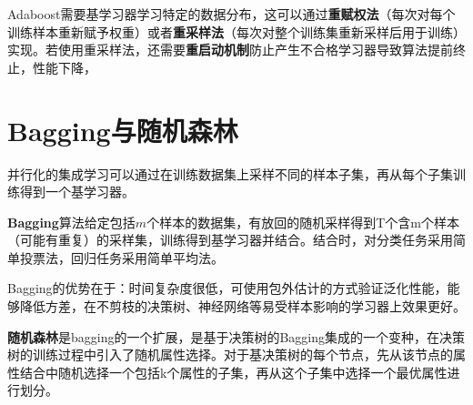 Adaboost需要基学习器学习特定的数据分布，这可以通过\textbf{重赋权法}（每次对每个训练样本重新赋予权重）或者\textbf{重采样法}（每次对整个训练集重新采样后用于训练）实现。若使用重采样法，还需要\textbf{重启动机制}防止产生不合格学习器导致算法提前终止，性能下降，

\section{Bagging与随机森林}\label{sec:8.3}
并行化的集成学习可以通过在训练数据集上采样不同的样本子集，再从每个子集训练得到一个基学习器。

\textbf{Bagging}算法给定包括$m$个样本的数据集，有放回的随机采样得到T个含m个样本（可能有重复）的采样集，训练得到基学习器并结合。结合时，对分类任务采用简单投票法，回归任务采用简单平均法。

Bagging的优势在于：时间复杂度很低，可使用包外估计的方式验证泛化性能，能够降低方差，在不剪枝的决策树、神经网络等易受样本影响的学习器上效果更好。

\textbf{随机森林}是bagging的一个扩展，是基于决策树的Bagging集成的一个变种，在决策树的训练过程中引入了随机属性选择。对于基决策树的每个节点，先从该节点的属性结合中随机选择一个包括k个属性的子集，再从这个子集中选择一个最优属性进行划分。

